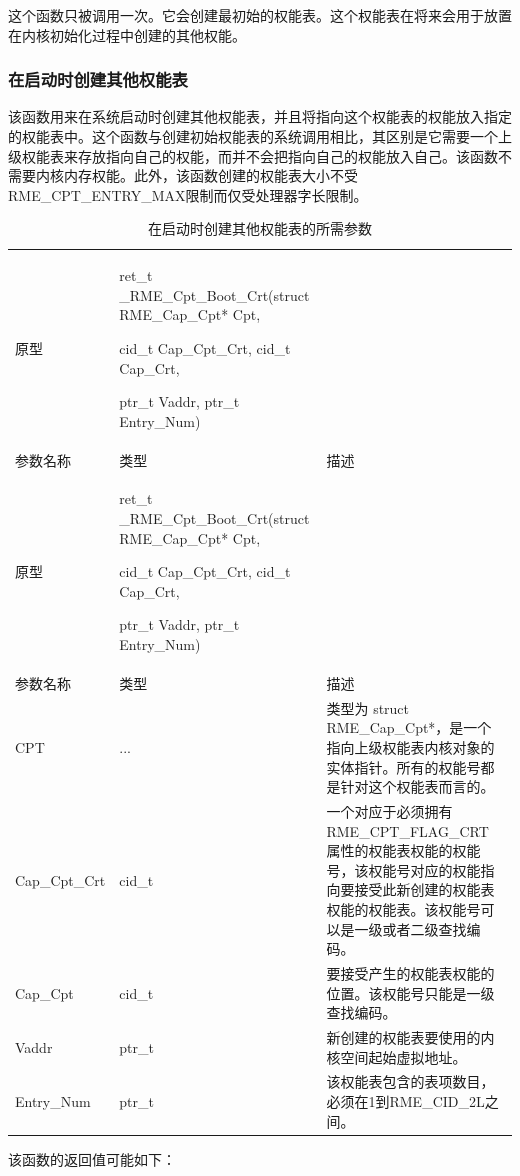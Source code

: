 这个函数只被调用一次。它会创建最初始的权能表。这个权能表在将来会用于放置在内核初始化过程中创建的其他权能。

\subsubsection{在启动时创建其他权能表}\label{subsubsec:7-create-other-capability-tables-at-boot}

该函数用来在系统启动时创建其他权能表，并且将指向这个权能表的权能放入指定的权能表中。这个函数与创建初始权能表的系统调用相比，其区别是它需要一个上级权能表来存放指向自己的权能，而并不会把指向自己的权能放入自己。该函数不需要内核内存权能。此外，该函数创建的权能表大小不受RME\_CPT\_ENTRY\_MAX限制而仅受处理器字长限制。

\begin{xltabular}{\textwidth}{@{}>{\hsize\raggedright\arraybackslash}X>{\hsize\raggedright\arraybackslash}X>{\hsize\raggedright\arraybackslash}X@{}}
\caption{在启动时创建其他权能表的所需参数}\label{tab:7-43-create-other-capability-tables-at-boot-parameters}\\
\toprule
原型\strut
 & ret\_t \_RME\_Cpt\_Boot\_Crt(struct RME\_Cap\_Cpt* Cpt,

cid\_t Cap\_Cpt\_Crt, cid\_t Cap\_Crt,

ptr\_t Vaddr, ptr\_t Entry\_Num)\strut
 & \strut
\tabularnewline
参数名称 & 类型 & 描述\tabularnewline
\endfirsthead
\toprule
原型\strut
 & ret\_t \_RME\_Cpt\_Boot\_Crt(struct RME\_Cap\_Cpt* Cpt,

cid\_t Cap\_Cpt\_Crt, cid\_t Cap\_Crt,

ptr\_t Vaddr, ptr\_t Entry\_Num)\strut
 & \strut
\tabularnewline
参数名称 & 类型 & 描述\tabularnewline
\midrule
\endhead
\bottomrule
\endlastfoot
CPT & ... &
类型为 struct RME\_Cap\_Cpt*，是一个指向上级权能表内核对象的实体指针。所有的权能号都是针对这个权能表而言的。\tabularnewline
Cap\_Cpt\_Crt & cid\_t &
一个对应于必须拥有 RME\_CPT\_FLAG\_CRT 属性的权能表权能的权能号，该权能号对应的权能指向要接受此新创建的权能表权能的权能表。该权能号可以是一级或者二级查找编码。\tabularnewline
Cap\_Cpt & cid\_t &
要接受产生的权能表权能的位置。该权能号只能是一级查找编码。\tabularnewline
Vaddr & ptr\_t &
新创建的权能表要使用的内核空间起始虚拟地址。\tabularnewline
Entry\_Num & ptr\_t &
该权能表包含的表项数目，必须在1到RME\_CID\_2L之间。\tabularnewline
\end{xltabular}

该函数的返回值可能如下：

